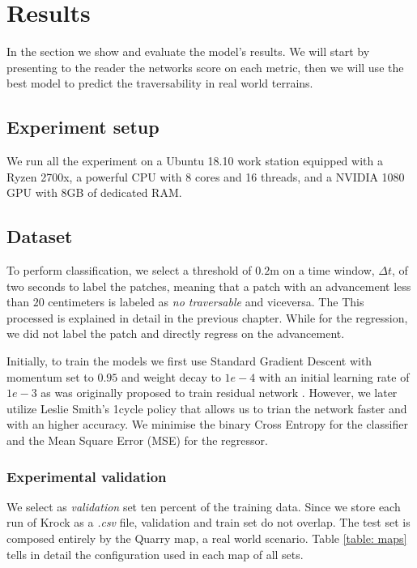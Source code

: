 \documentclass[../document.tex]{subfiles}
\begin{document}
\chapter{Results}
In the section we show and evaluate the model's results. We will start by presenting to the reader the networks score on each metric, then we will use the best model to predict the traversability in real world terrains. 
\section{Experiment setup}
We run all the experiment on a Ubuntu 18.10  work station equipped with a Ryzen 2700x, a powerful CPU with 8 cores and 16 threads, and a NVIDIA 1080 GPU with 8GB of dedicated RAM.
\section{Dataset}
To perform classification, we select a threshold of $0.2$m on a time window, $\Delta t$, of two seconds to label the patches, meaning that a patch with an advancement less than $20$ centimeters is labeled as \emph{no traversable} and viceversa. The  This processed is explained in detail in the previous chapter. While for the regression, we did not label the patch and directly regress on the advancement.

Initially, to train the models we first use Standard Gradient Descent with momentum set to $0.95$ and weight decay to $1e-4$ with an initial learning rate of $1e-3$ as was originally proposed to train residual network \cite{he2015deep}. However, we later utilize Leslie Smith's 1cycle policy \cite{1cycle} that allows us to trian the network faster and with an higher accuracy. We minimise the binary Cross Entropy for the classifier and the  Mean Square Error (MSE) for the regressor.
\subsection{Experimental validation}
We select as \emph{validation} set ten percent of the training data. Since we store each run of Krock as a \emph{.csv} file, validation and train set do not overlap. 
The test set is composed entirely by the Quarry map, a real world scenario. Table \ref{table: maps} tells in detail the configuration used in each map of all sets.
\end{document}

